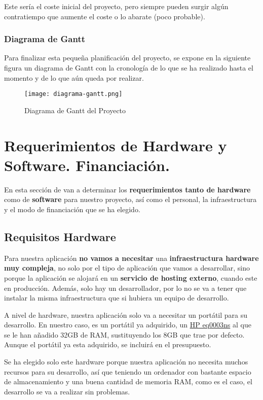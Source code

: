 Este sería el coste inicial del proyecto, pero siempre pueden surgir algún contratiempo que aumente el coste o lo abarate (poco probable).

\subsubsection{Diagrama de Gantt}
Para finalizar esta pequeña planificación del proyecto, se expone en la siguiente figura un diagrama de Gantt con la cronología de lo que se ha realizado hasta el momento y de lo que aún queda por realizar.

\begin{figure}[ht]
	\centering
	\texttt{[image: diagrama-gantt.png]}
	\caption{Diagrama de Gantt del Proyecto}
\end{figure}

\section{Requerimientos de Hardware y Software. Financiación.}
En esta sección de van a determinar los \textbf{requerimientos tanto de hardware} como de \textbf{software} para nuestro proyecto, así como el personal, la infraestructura y el modo de financiación que se ha elegido.

\subsection{Requisitos Hardware}
Para nuestra aplicación \textbf{no vamos a necesitar} una \textbf{infraestructura hardware muy compleja}, no solo por el tipo de aplicación que vamos a desarrollar, sino porque la aplicación se alojará en un \textbf{servicio de hosting externo}, cuando este en producción. Además, solo hay un desarrollador, por lo no se va a tener que instalar la misma infraestructura que si hubiera un equipo de desarrollo.

A nivel de hardware, nuestra aplicación solo va a necesitar un portátil para su desarrollo. En nuestro caso, es un portátil ya adquirido, un \href{https://support.hp.com/uy-es/document/c06645278}{HP eq0003ns} al que se le han añadido 32GB de RAM, sustituyendo los 8GB que trae por defecto. Aunque el portátil ya esta adquirido, se incluirá en el presupuesto.

Se ha elegido solo este hardware porque nuestra aplicación no necesita muchos recursos para su desarrollo, así que teniendo un ordenador con bastante espacio de almacenamiento y una buena cantidad de memoria RAM, como es el caso, el desarrollo se va a realizar sin problemas.

